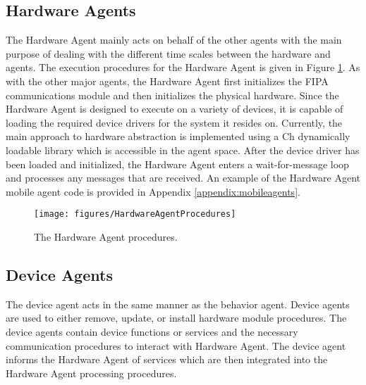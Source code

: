     \subsection{Hardware Agents}
      The Hardware Agent mainly acts on behalf of the other agents with the main
        purpose of dealing with the different time scales between the 
        hardware and agents.
      The execution procedures for the Hardware Agent is given in Figure
        \ref{fig:hardwareprocedures}.
      As with the other major agents, the Hardware Agent first initializes the
        FIPA communications module and then initializes the physical hardware.
      Since the Hardware Agent is designed to execute on a variety of devices,
        it is capable of loading the required device drivers for the system it
        resides on.
      Currently, the main approach to hardware abstraction is implemented using
        a Ch dynamically loadable library which is accessible in the agent space.
      After the device driver has been loaded and initialized, the Hardware
        Agent enters a wait-for-message loop and processes any messages that
        are received.
      An example of the Hardware Agent mobile agent code is provided in Appendix 
        \ref{appendix:mobileagents}.
      \begin{figure}%
      \centerline{
        \texttt{[image: figures/HardwareAgentProcedures]}}
      \caption{The Hardware Agent procedures.}
      \label{fig:hardwareprocedures}
      \end{figure}

    \subsection{Device Agents}
      The device agent acts in the same manner as the behavior agent.
      Device agents are used to either remove, update, or install hardware
        module procedures.
      The device agents contain device functions or services and the necessary 
         communication procedures to interact with Hardware Agent.
      The device agent informs the Hardware Agent of services which are then
        integrated into the Hardware Agent processing procedures.

